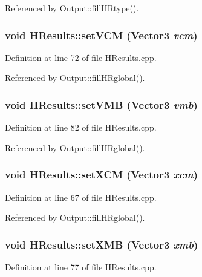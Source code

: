 Referenced by Output::fillHRtype().

\subsubsection[{setVCM}]{\setlength{\rightskip}{0pt plus 5cm}void HResults::setVCM ({\bf Vector3} {\em vcm})}\label{classHResults_ab8a80c15d74b17cd1ddfb056af585f85}


Definition at line 72 of file HResults.cpp.



Referenced by Output::fillHRglobal().

\subsubsection[{setVMB}]{\setlength{\rightskip}{0pt plus 5cm}void HResults::setVMB ({\bf Vector3} {\em vmb})}\label{classHResults_ab9c92139174c77e0dbfd68aca55ea958}


Definition at line 82 of file HResults.cpp.



Referenced by Output::fillHRglobal().

\subsubsection[{setXCM}]{\setlength{\rightskip}{0pt plus 5cm}void HResults::setXCM ({\bf Vector3} {\em xcm})}\label{classHResults_ad67d9d232544843e465c0d25a7139815}


Definition at line 67 of file HResults.cpp.



Referenced by Output::fillHRglobal().

\subsubsection[{setXMB}]{\setlength{\rightskip}{0pt plus 5cm}void HResults::setXMB ({\bf Vector3} {\em xmb})}\label{classHResults_ab2f4c44def844143a8ac6e158e94c445}


Definition at line 77 of file HResults.cpp.



